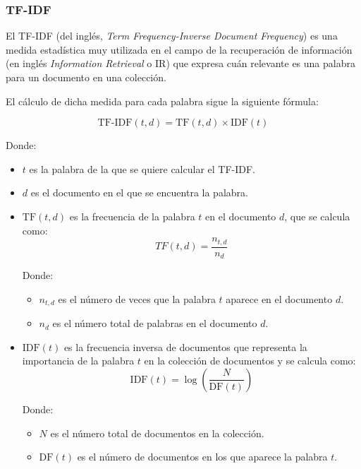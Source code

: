 \subsubsection{TF-IDF}
El TF-IDF (del inglés, \textit{Term Frequency-Inverse Document Frequency}) es una medida estadística muy utilizada en el campo de la recuperación de información
(en inglés \textit{Information Retrieval} o IR) que expresa cuán relevante es una palabra para un documento en una colección.

\bigskip
El cálculo de dicha medida para cada palabra sigue la siguiente fórmula:

\begin{equation}
	\label{eq:tfidf}
	\text{TF-IDF}(t,d) = \text{TF}(t,d) \times \text{IDF}(t)
\end{equation}

Donde:
\begin{itemize}
	\item $t$ es la palabra de la que se quiere calcular el TF-IDF.
	\item $d$ es el documento en el que se encuentra la palabra.
	\item $\text{TF}(t,d)$ es la frecuencia de la palabra $t$ en el documento $d$, que se calcula como:
	      \begin{equation}
		      \label{eq:tf}
		      TF(t,d) = \frac{n_{t,d}}{n_d}
	      \end{equation}

	      Donde:
	      \begin{itemize}
		      \item $n_{t,d}$ es el número de veces que la palabra $t$ aparece en el documento $d$.
		      \item $n_d$ es el número total de palabras en el documento $d$.
	      \end{itemize}

	\item $\text{IDF}(t)$ es la frecuencia inversa de documentos que representa la importancia de la palabra $t$ en la colección de documentos y
	      se calcula como:
	      \begin{equation}
		      \label{eq:idf}
		      \text{IDF}(t) = \log \left(\frac{N}{\text{DF}(t)}\right)
	      \end{equation}

	      Donde:
	      \begin{itemize}
		      \item $N$ es el número total de documentos en la colección.
		      \item $\text{DF}(t)$ es el número de documentos en los que aparece la palabra $t$.
	      \end{itemize}
\end{itemize}

